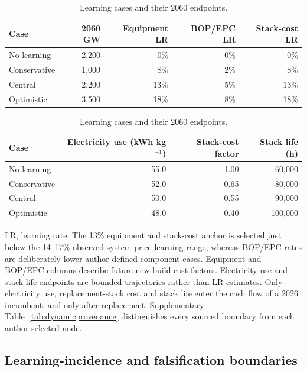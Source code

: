 \documentclass[11pt,a4paper]{article}
\begin{document}
\begin{table}[!ht]
\caption{Learning cases and their 2060 endpoints.}\label{tab:learning}
\centering
\footnotesize
\begin{tabular}{lrrrr}
\toprule
Case & 2060 GW & Equipment LR & BOP/EPC LR & Stack-cost LR \\
\midrule
No learning & 2,200 & 0\% & 0\% & 0\% \\
Conservative & 1,000 & 8\% & 2\% & 8\% \\
Central & 2,200 & 13\% & 5\% & 13\% \\
Optimistic & 3,500 & 18\% & 8\% & 18\% \\
\bottomrule
\end{tabular}
\par\vspace{5pt}
\begin{tabular}{lrrr}
\toprule
Case & Electricity use (kWh kg$^{-1}$) & Stack-cost factor & Stack life (h) \\
\midrule
No learning & 55.0 & 1.00 & 60,000 \\
Conservative & 52.0 & 0.65 & 80,000 \\
Central & 50.0 & 0.55 & 90,000 \\
Optimistic & 48.0 & 0.40 & 100,000 \\
\bottomrule
\end{tabular}
\begin{flushleft}\footnotesize
LR, learning rate. The 13\% equipment and stack-cost anchor is selected just below the 14--17\% observed system-price learning range, whereas BOP/EPC rates are deliberately lower author-defined component cases\cite{glenk2023,ferioli2009}. Equipment and BOP/EPC columns describe future new-build cost factors. Electricity-use and stack-life endpoints are bounded trajectories rather than LR estimates\cite{doe2024,worldbank2026}. Only electricity use, replacement-stack cost and stack life enter the cash flow of a 2026 incumbent, and only after replacement. Supplementary Table~\ref{tab:dynamicprovenance} distinguishes every sourced boundary from each author-selected node.
\end{flushleft}
\end{table}
\FloatBarrier

\subsection{Learning-incidence and falsification boundaries}
\end{document}
